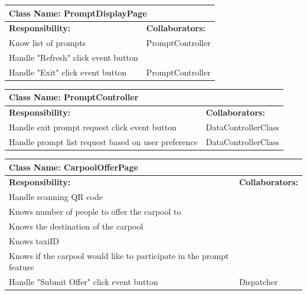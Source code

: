 \documentclass[]{article}
\begin{document}
	\begin{table}[H]
	\centering
	\begin{tabular}{|p{6cm}|p{6cm}|}
	\hline 
		\multicolumn{2}{|l|}{\textbf{Class Name: PromptDisplayPage}} \\
	\hline
	\textbf{Responsibility:} & \textbf{Collaborators:} \\
	\hline
	Know list of prompts & PromptController\\ \hline
	Handle "Refresh" click event button & \\ \hline
	Handle "Exit" click event button & PromptController \\ \hline
	\end{tabular}
	\end{table}
	
	\begin{table}[H]
	\centering
	\begin{tabular}{|p{6cm}|p{6cm}|}
	\hline 
		\multicolumn{2}{|l|}{\textbf{Class Name: PromptController}} \\
	\hline
	\textbf{Responsibility:} & \textbf{Collaborators:} \\
	\hline
	Handle exit prompt request click event button & DataControllerClass\\ \hline
	Handle prompt list request based on user preference & DataControllerClass\\ \hline
	\end{tabular}
	\end{table}
	
	\begin{table}[H]
	\centering
	\begin{tabular}{|p{6cm}|p{6cm}|}
	\hline 
		\multicolumn{2}{|l|}{\textbf{Class Name: CarpoolOfferPage}} \\
	\hline
	\textbf{Responsibility:} & \textbf{Collaborators:} \\
	\hline
	Handle scanning QR code &  \\ \hline
	Knows number of people to offer the carpool to &\\ \hline
	Knows the destination of the carpool &\\ \hline
	Knows taxiID &\\ \hline
	Knows if the carpool would like to participate in the prompt feature & \\ \hline
	Handle "Submit Offer" click event button & Dispatcher\\ \hline
	\end{tabular}
	\end{table}
	
\end{document}
